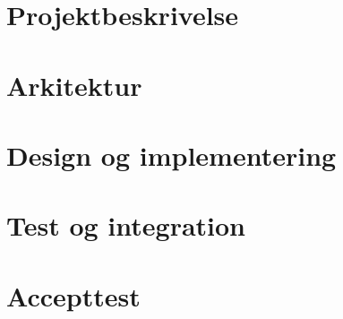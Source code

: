 \documentclass[a4paper,11pt,oneside]{memoir}
\begin{document}
		
	\frontmatter
	\pagestyle{asereport}
						\clearpage %
	\tableofcontents						\clearpage %
	
	\mainmatter
			\clearpage %
	\part{Projektbeskrivelse}	
			\clearpage %
	\part{Arkitektur}
			\clearpage %
	\part{Design og implementering}
	
	
	
	\part{Test og integration}
						\clearpage %
	\part{Accepttest}
				\clearpage %
					\clearpage %
	
	\backmatter
	\printnoidxglossary[title=Ordliste]		%
	
	\clearpage
	\printbibliography[title={Litteratur}] 	%
\end{document}
